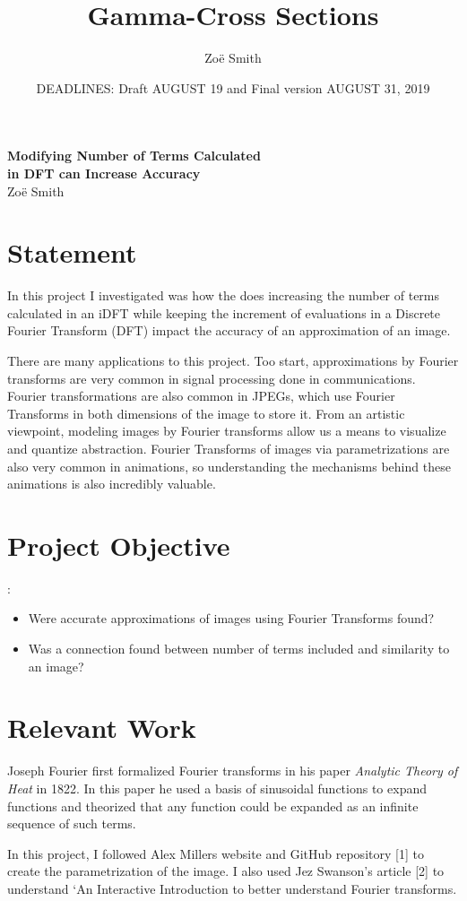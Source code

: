 \documentclass[psamsfonts]{amsart}
\title{Gamma-Cross Sections}
\author{Zo\"e Smith}
\date{DEADLINES: Draft AUGUST 19 and Final version AUGUST 31, 2019}
\theoremstyle{definition}
\theoremstyle{remark}
\numberwithin{equation}{section}
\begin{document}
\begin{center}
	{\bfseries Modifying Number of Terms Calculated \\in DFT can Increase Accuracy}\\
	Zo\"e Smith
\end{center}

 \section{Statement}
 In this project I investigated was how the does increasing the number of terms calculated in an iDFT while keeping the increment of evaluations in a Discrete Fourier Transform (DFT) impact the accuracy of an approximation of an image. 
 
 There are many applications to this project. Too start, approximations by Fourier transforms are very common in signal processing done in communications. Fourier transformations are also common in JPEGs, which use Fourier Transforms in both dimensions of the image to store it. From an artistic viewpoint, modeling images by Fourier transforms allow us a means to visualize and quantize abstraction. Fourier Transforms of images via parametrizations are also very common in animations, so understanding the mechanisms behind these animations is also incredibly valuable. 
 \section{Project Objective}:
 \begin{itemize}
 	\item Were accurate approximations of images using Fourier Transforms found?
 	\item Was a connection found between number of terms included and similarity to an image?
 \end{itemize}
 
 \section{Relevant Work}
 Joseph Fourier first formalized Fourier transforms in his paper \textit{Analytic Theory of Heat} in 1822. In this paper he used a basis of sinusoidal functions to expand functions and theorized that any function could be expanded as an infinite sequence of such terms. 
 
 In this project, I followed Alex Millers website and GitHub repository [1] to create the parametrization of the image. I also used Jez Swanson's article [2] to understand `An Interactive Introduction to better understand Fourier transforms.
 
\end{document}
